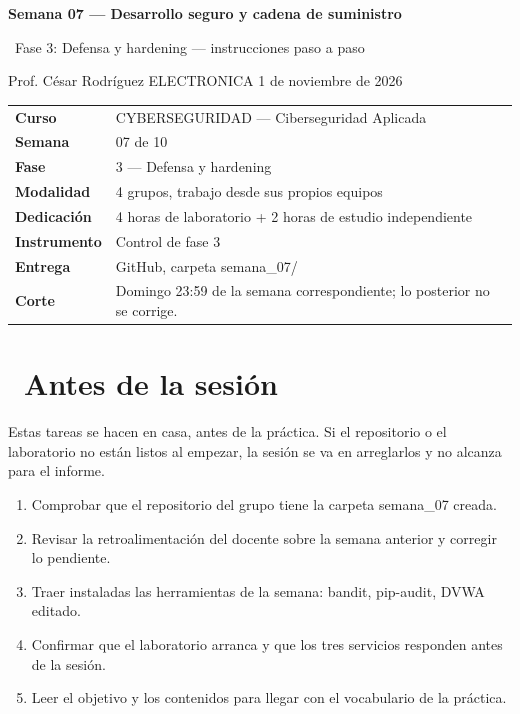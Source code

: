 \documentclass[11pt,a4paper]{article}
\newcommand{\iconoBanda}{microchip}
\newcommand{\bandaTitulo}[3][fondoOscuro]{%
  \begin{tcolorbox}[
    enhanced,
    colback=#1, colframe=#1,
    boxrule=0pt, arc=8pt, outer arc=8pt,
    width=\linewidth,
    top=18pt, bottom=6pt, left=14pt, right=14pt,
    borderline south={3.5pt}{0pt}{cyanNeon},
  ]
    \begin{minipage}[c]{0.07\linewidth}
      \centering
      \textcolor{cyanNeon}{\fontsize{30}{30}\selectfont\faIcon{\iconoBanda}}
    \end{minipage}%
    \hspace{8pt}%
    \begin{minipage}[c]{0.88\linewidth}
      {\fontsize{20}{24}\selectfont\bfseries\color{white}#2}\par\vspace{5pt}%
      \textcolor{cyanNeon!80!white}{\small\faIcon{angle-right}~#3}%
    \end{minipage}
    \vspace{4pt}
  \end{tcolorbox}%
  \vspace{8pt}%
}
\newcommand{\iconotexto}[2]{\textcolor{cyanNeon}{\faIcon{#1}}~#2}
\renewcommand{\iconoBanda}{shield-alt}
\begin{document}
\bandaTitulo[fondoOscuro]{Semana 07 --- Desarrollo seguro y cadena de suministro}{Fase 3: Defensa y hardening --- instrucciones paso a paso}

\begin{center}\small\color{grisTexto}Prof. César Rodríguez \textbar{} ELECTRONICA \textbar{} 1 de noviembre de 2026\end{center}

\begin{tabularx}{\linewidth}{@{}>{\raggedright\arraybackslash}p{4.6cm}X@{}}
\toprule
\textbf{Curso} & CYBERSEGURIDAD --- Ciberseguridad Aplicada \\
\textbf{Semana} & 07 de 10 \\
\textbf{Fase} & 3 --- Defensa y hardening \\
\textbf{Modalidad} & 4 grupos, trabajo desde sus propios equipos \\
\textbf{Dedicación} & 4 horas de laboratorio + 2 horas de estudio independiente \\
\textbf{Instrumento} & Control de fase 3 \\
\textbf{Entrega} & GitHub, carpeta semana\_07/ \\
\textbf{Corte} & Domingo 23:59 de la semana correspondiente; lo posterior no se corrige. \\
\bottomrule
\end{tabularx}

\section{\iconotexto{clock}{Antes de la sesión}}

Estas tareas se hacen en casa, antes de la práctica. Si el repositorio o el laboratorio no están listos al empezar, la sesión se va en arreglarlos y no alcanza para el informe.

\begin{enumerate}[leftmargin=1.4em,itemsep=2pt,topsep=3pt]
  \item Comprobar que el repositorio del grupo tiene la carpeta semana\_07 creada.
  \item Revisar la retroalimentación del docente sobre la semana anterior y corregir lo pendiente.
  \item Traer instaladas las herramientas de la semana: bandit, pip-audit, DVWA editado.
  \item Confirmar que el laboratorio arranca y que los tres servicios responden antes de la sesión.
  \item Leer el objetivo y los contenidos para llegar con el vocabulario de la práctica.
\end{enumerate}
\end{document}
